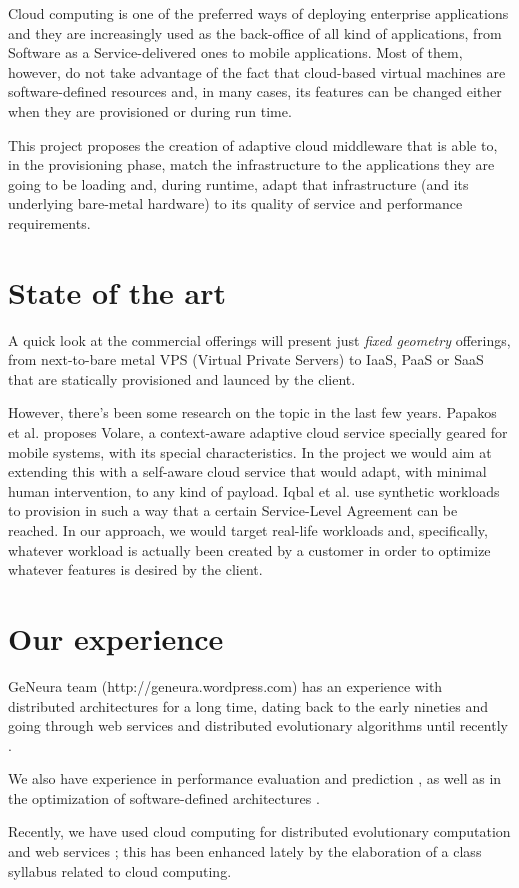 \documentclass[a4paper]{article}
\begin{document}
Cloud computing is one of the preferred ways of deploying enterprise
applications and they are increasingly used as the back-office of all
kind of applications, from Software as a Service-delivered ones to
mobile applications. Most of them, however, do not take advantage of
the fact that cloud-based virtual machines are software-defined
resources and, in many cases, its features can be changed either when
they are provisioned or during run time.

This project proposes the creation of adaptive cloud middleware that
is able to, in the provisioning phase, match the infrastructure to
the applications they are going to be loading and, during runtime,
adapt that infrastructure (and its underlying bare-metal hardware) to
its quality of service and performance requirements. 

\section{State of the art}

A quick look at the commercial offerings will present just {\em fixed
  geometry} offerings, from next-to-bare metal VPS (Virtual Private
Servers) to IaaS, PaaS or SaaS that are statically provisioned and
launced by the client.

However, there's been some research on the topic in the last few
years. Papakos et al. \cite{Papakos} proposes
Volare, a context-aware adaptive cloud service specially geared for
mobile systems, with its special characteristics. In the project we
would aim at extending this with a self-aware cloud service that would
adapt, with minimal human intervention, to any kind of payload. Iqbal
et al. \cite{Iqbal2011871} use synthetic workloads to provision in
such a way that a certain Service-Level Agreement can be reached. In
our approach, we would target real-life workloads and, specifically,
whatever workload is actually been created by a customer in order to
optimize whatever features is desired by the client.

\section{Our experience}

GeNeura team (http://geneura.wordpress.com) has an experience with
distributed architectures for a long time, dating back to the early
nineties \cite{parallel90} and going through web services and
distributed evolutionary algorithms until recently
\cite{Jini:FEA2000,agajaj,LNCS44480129,Araujo2010}.

We also have experience in performance evaluation and prediction
\cite{castillo:evostar08,hardwareevo}, as well as in the optimization of
software-defined architectures \cite{gecco08:castillo}.

Recently, we have used cloud computing for distributed evolutionary
computation \cite{sofea:naco,mericloud} and web services
\cite{DBLP:journals/soco/Garcia-SanchezGCAG13}; this has been enhanced
lately 
by the elaboration of a class syllabus related to cloud computing. 




\end{document}
